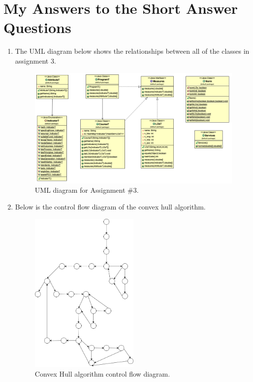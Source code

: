 \documentclass[12pt]{article}
\begin{document}
\section{My Answers to the Short Answer Questions}
\begin{enumerate}
  \item The UML diagram below shows the relationships between all of the classes in assignment 3.\\
  \begin{figure}[h]
    \centering
    \includegraphics[width=1.0\textwidth]{A3uml.png}
    \caption{UML diagram for Assignment \#3.}
    \label{Figure 3:}
  \end{figure}
  \newpage
  \item Below is the control flow diagram of the convex hull algorithm.\\
  \begin{figure}[h]
    \centering
    \includegraphics[width=0.5\textwidth]{controlflow.png}
    \caption{Convex Hull algorithm control flow diagram.}
    \label{Figure 4:}
  \end{figure}
\end{enumerate}
\end{document}
